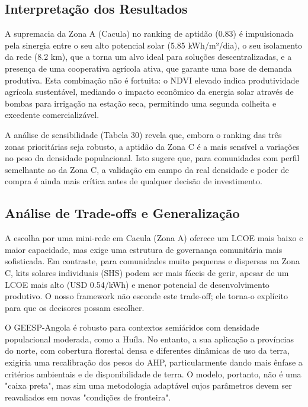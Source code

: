 \documentclass[12pt, a4paper]{article}
\begin{document}
\subsection{Interpretação dos Resultados}

A supremacia da Zona A (Cacula) no ranking de aptidão (0.83) é impulsionada pela sinergia entre o seu alto potencial solar (5.85 kWh/m²/dia), o seu isolamento da rede (8.2 km), que a torna um alvo ideal para soluções descentralizadas, e a presença de uma cooperativa agrícola ativa, que garante uma base de demanda produtiva. Esta combinação não é fortuita: o NDVI elevado indica produtividade agrícola sustentável, mediando o impacto econômico da energia solar através de bombas para irrigação na estação seca, permitindo uma segunda colheita e excedente comercializável.

A análise de sensibilidade (Tabela 30) revela que, embora o ranking das três zonas prioritárias seja robusto, a aptidão da Zona C é a mais sensível a variações no peso da densidade populacional. Isto sugere que, para comunidades com perfil semelhante ao da Zona C, a validação em campo da real densidade e poder de compra é ainda mais crítica antes de qualquer decisão de investimento.

\subsection{Análise de Trade-offs e Generalização}

A escolha por uma mini-rede em Cacula (Zona A) oferece um LCOE mais baixo e maior capacidade, mas exige uma estrutura de governança comunitária mais sofisticada. Em contraste, para comunidades muito pequenas e dispersas na Zona C, kits solares individuais (SHS) podem ser mais fáceis de gerir, apesar de um LCOE mais alto (USD 0.54/kWh) e menor potencial de desenvolvimento produtivo. O nosso framework não esconde este trade-off; ele torna-o explícito para que os decisores possam escolher.

O GEESP-Angola é robusto para contextos semiáridos com densidade populacional moderada, como a Huíla. No entanto, a sua aplicação a províncias do norte, com cobertura florestal densa e diferentes dinâmicas de uso da terra, exigiria uma recalibração dos pesos do AHP, particularmente dando mais ênfase a critérios ambientais e de disponibilidade de terra. O modelo, portanto, não é uma "caixa preta", mas sim uma metodologia adaptável cujos parâmetros devem ser reavaliados em novas "condições de fronteira".
\end{document}
